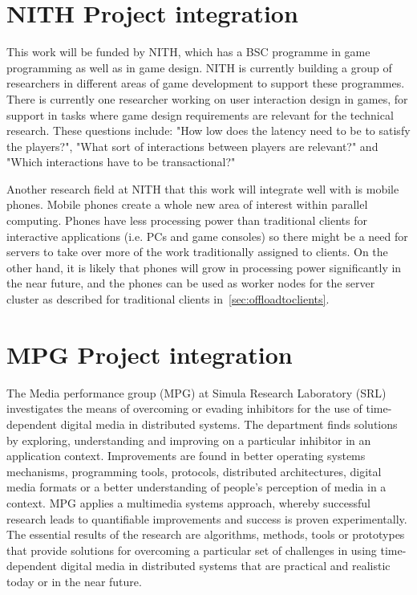 \documentclass{article}
\begin{document}
\section{NITH Project integration}
This work will be funded by NITH, which has a BSC programme in game
programming as well as in game design. NITH is currently building a
group of researchers in different areas of game development to support
these programmes. There is currently one researcher working on user
interaction design in games, for support in tasks where  game
design requirements are relevant for the technical research. These
questions include: "How low does the latency need to be to satisfy the
players?", "What sort of interactions between players are relevant?"
and "Which interactions have to be transactional?"

Another research field at NITH that this work will integrate well
with is mobile phones. Mobile phones create a whole new area of
interest within parallel computing. Phones have less processing power
than traditional clients for interactive applications (i.e. PCs and
game consoles) so there might be a need for servers to take over more
of the work traditionally assigned to clients. On the other hand, it
is likely that phones will grow in processing power significantly in
the near future, and the phones can be used as worker nodes for the
server cluster as described for traditional clients
in~\ref{sec:offloadtoclients}.


\section{MPG Project integration}
The Media performance group (MPG) at Simula Research Laboratory (SRL)
investigates the means of overcoming or evading inhibitors for the use
of time-dependent digital media in distributed systems. The department
finds solutions by exploring, understanding and improving on a
particular inhibitor in an application context. Improvements are found
in better operating systems mechanisms, programming tools, protocols,
distributed architectures, digital media formats or a better
understanding of people's perception of media in a context. MPG
applies a multimedia systems approach, whereby successful research
leads to quantifiable improvements and success is proven
experimentally. The essential results of the research are algorithms,
methods, tools or prototypes that provide solutions for overcoming a
particular set of challenges in using time-dependent digital media in
distributed systems that are practical and realistic today or in the
near future.
\end{document}
